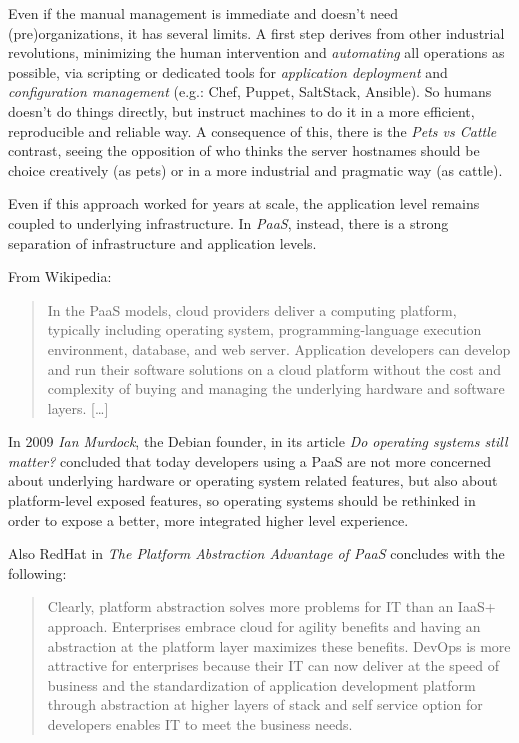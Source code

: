 Even if the manual management is immediate and doesn't need
(pre)organizations, it has several limits. A first step derives from
other industrial revolutions, minimizing the human intervention and
\textit{automating} all operations as possible, via scripting or
dedicated tools for \textit{application deployment} and
\textit{configuration management} (e.g.: Chef, Puppet, SaltStack,
Ansible). So humans doesn't do things directly, but instruct machines to
do it in a more efficient, reproducible and reliable way. A consequence
of this, there is the \textit{Pets vs Cattle} contrast, seeing the
opposition of who thinks the server hostnames should be choice
creatively (as pets) or in a more industrial and pragmatic way (as
cattle).

Even if this approach worked for years at scale, the application level
remains coupled to underlying infrastructure. In \emph{PaaS}, instead,
there is a strong separation of infrastructure and application levels.

From Wikipedia:

\begin{quote}
In the PaaS models, cloud providers deliver a computing platform,
typically including operating system, programming-language execution
environment, database, and web server. Application developers can
develop and run their software solutions on a cloud platform without the
cost and complexity of buying and managing the underlying hardware and
software layers. {[}\ldots{}{]}
\end{quote}

In 2009 \textit{Ian Murdock}, the Debian founder, in its article \emph{Do
operating systems still matter?}\cite{DoOperatingSystemsStillMatter}
concluded that today developers using a PaaS are not more concerned
about underlying hardware or operating system related features, but also
about platform-level exposed features, so operating systems should be
rethinked in order to expose a better, more integrated higher level
experience.

Also RedHat in \textit{The Platform Abstraction Advantage of
PaaS}\cite{ThePlatformAbstractionAdvantageOfPaaS} concludes with the
following:

\begin{quote}
Clearly, platform abstraction solves more problems for IT than an IaaS+
approach. Enterprises embrace cloud for agility benefits and having an
abstraction at the platform layer maximizes these benefits. DevOps is
more attractive for enterprises because their IT can now deliver at the
speed of business and the standardization of application development
platform through abstraction at higher layers of stack and self service
option for developers enables IT to meet the business needs.
\end{quote}

